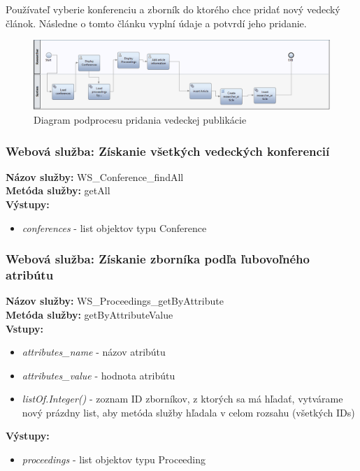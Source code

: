 \documentclass[10pt,oneside,slovak,a4paper]{article}
\begin{document}
Používateľ vyberie konferenciu a zborník do ktorého chce pridať nový vedecký článok. Následne o tomto článku vyplní údaje a potvrdí jeho pridanie.

\begin{figure} [H]
\centering
\includegraphics[scale=0.4]{diagrams/diagAddArticle.png} 
\caption{Diagram podprocesu pridania vedeckej publikácie}
\end{figure}

\subsubsection{Webová služba: Získanie všetkých vedeckých konferencií}
\textbf{Názov služby:} WS\_Conference\_findAll\\
\textbf{Metóda služby:} getAll\\
\textbf{Výstupy:}
	\begin{itemize}
		\item \textit{conferences} - list objektov typu Conference
	\end{itemize}
	
\subsubsection{Webová služba: Získanie zborníka podľa ľubovoľného atribútu}
\textbf{Názov služby:} WS\_Proceedings\_getByAttribute\\
\textbf{Metóda služby:} getByAttributeValue\\
\textbf{Vstupy:}
	\begin{itemize}
		\item \textit{attributes\_name} - názov atribútu
		\item \textit{attributes\_value} - hodnota atribútu
		\item \textit{listOf.Integer()} - zoznam ID zborníkov, z ktorých sa má hľadať, vytvárame nový prázdny list, aby metóda služby hľadala v celom rozsahu (všetkých IDs)
	\end{itemize}
\textbf{Výstupy:}
	\begin{itemize}
		\item \textit{proceedings} - list objektov typu Proceeding
	\end{itemize}
	
\end{document}
